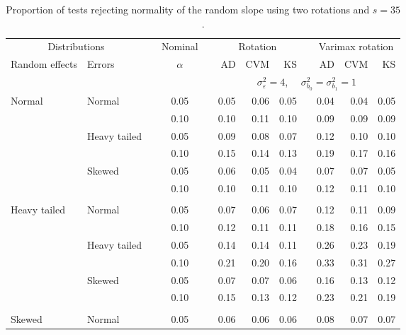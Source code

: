 \begin{table}[ht]
\centering
\caption{\label{tab:simb135}Proportion of tests rejecting normality of the random slope using two rotations and $s = 35$.}
\begin{scriptsize}
\begin{tabular}{ll p{.1cm} c p{.1cm} rrr p{.1cm} rrr}
  \hline
  \multicolumn{2}{c}{Distributions}& & Nominal & &  \multicolumn{3}{c}{Rotation} & & \multicolumn{3}{c}{Varimax rotation} \\ \cline{1-2} \cline{6-8} \cline{10-12}   
  Random effects & Errors & & $\alpha$ & & AD & CVM & KS & & AD & CVM & KS \\ 
   \hline
& && && \multicolumn{7}{c}{$\sigma_{\varepsilon}^2 = 4$, \ \ $\sigma_{b_0}^2 = \sigma_{b_1}^2 = 1$} \\ \cline{6-12}
\rowcolor{gray!20}Normal       & Normal       && 0.05 &&  0.05 & 0.06 & 0.05 && 0.04 & 0.04 & 0.05 \\ 
\rowcolor{gray!20}             &              && 0.10 &&  0.10 & 0.11 & 0.10 && 0.09 & 0.09 & 0.09 \\ 
\rowcolor{gray!20}             & Heavy tailed && 0.05 &&  0.09 & 0.08 & 0.07 && 0.12 & 0.10 & 0.10 \\ 
\rowcolor{gray!20}             &              && 0.10 &&  0.15 & 0.14 & 0.13 && 0.19 & 0.17 & 0.16 \\ 
\rowcolor{gray!20}             & Skewed       && 0.05 &&  0.06 & 0.05 & 0.04 && 0.07 & 0.07 & 0.05 \\ 
\rowcolor{gray!20}             &              && 0.10 &&  0.10 & 0.11 & 0.10 && 0.12 & 0.11 & 0.10 \\ 
             &&&&&&&&&&&\\
Heavy tailed & Normal       && 0.05 &&  0.07 & 0.06 & 0.07 && 0.12 & 0.11 & 0.09 \\ 
             &              && 0.10 &&  0.12 & 0.11 & 0.11 && 0.18 & 0.16 & 0.15 \\ 
             & Heavy tailed && 0.05 &&  0.14 & 0.14 & 0.11 && 0.26 & 0.23 & 0.19 \\ 
             &              && 0.10 &&  0.21 & 0.20 & 0.16 && 0.33 & 0.31 & 0.27 \\ 
             & Skewed       && 0.05 &&  0.07 & 0.07 & 0.06 && 0.16 & 0.13 & 0.12 \\ 
             &              && 0.10 &&  0.15 & 0.13 & 0.12 && 0.23 & 0.21 & 0.19 \\ 
             &&&&&&&&&&&\\
Skewed       & Normal       && 0.05 &&  0.06 & 0.06 & 0.06 && 0.08 & 0.07 & 0.07 \\ 

\end{tabular}
\end{scriptsize}
\end{table}
